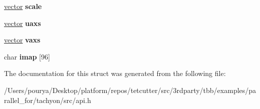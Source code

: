\begin{DoxyCompactItemize}
\item 
\hypertarget{structapitexture_a2f7fca2226448b2908c35b6a668ef08b}{}\hyperlink{structvector}{vector} {\bfseries scale}\label{structapitexture_a2f7fca2226448b2908c35b6a668ef08b}

\item 
\hypertarget{structapitexture_af39a0d4e0355ffca814aaf1b70589fdc}{}\hyperlink{structvector}{vector} {\bfseries uaxs}\label{structapitexture_af39a0d4e0355ffca814aaf1b70589fdc}

\item 
\hypertarget{structapitexture_ac8b4e6ea7afc2ad6ae7ae96178a8c955}{}\hyperlink{structvector}{vector} {\bfseries vaxs}\label{structapitexture_ac8b4e6ea7afc2ad6ae7ae96178a8c955}

\item 
\hypertarget{structapitexture_a0e0c25ae6fa3a5c269556241ece56753}{}char {\bfseries imap} \mbox{[}96\mbox{]}\label{structapitexture_a0e0c25ae6fa3a5c269556241ece56753}

\end{DoxyCompactItemize}


The documentation for this struct was generated from the following file\+:\begin{DoxyCompactItemize}
\item 
/\+Users/pourya/\+Desktop/platform/repos/tetcutter/src/3rdparty/tbb/examples/parallel\+\_\+for/tachyon/src/api.\+h\end{DoxyCompactItemize}

